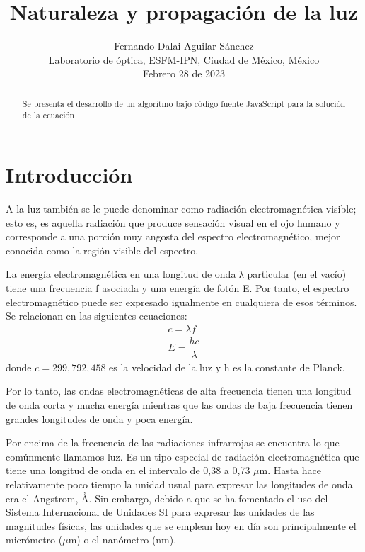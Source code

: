 \documentclass[10pt,journal]{IEEEtran}
\begin{document}
\title{Naturaleza y propagación de la luz}

\author{Fernando Dalai Aguilar Sánchez \\ Laboratorio de óptica, ESFM-IPN, Ciudad de México, México \\Febrero 28 de 2023}


\maketitle{}  

\begin{abstract}
Se presenta el desarrollo de un algoritmo bajo código fuente JavaScript para la solución de la ecuación 
\end{abstract}  

\section{Introducción}
A la luz también se le puede denominar como radiación electromagnética visible; esto
es, es aquella radiación que produce sensación visual en el ojo humano y corresponde a
una porción muy angosta del espectro electromagnético, mejor conocida como la región
visible del espectro.

La energía electromagnética en una longitud de onda λ particular (en el vacío) tiene una
frecuencia f asociada y una energía de fotón E. Por tanto, el espectro electromagnético
puede ser expresado igualmente en cualquiera de esos términos. Se relacionan en las
siguientes ecuaciones: 
\begin{align}
c = \lambda f \\
E = \dfrac{h c}{\lambda}
\end{align}
donde $c = 299{,}792{,}458$ es la velocidad de la luz y h es la constante de Planck. 

Por lo tanto, las ondas electromagnéticas de alta frecuencia tienen una longitud de onda
corta y mucha energía mientras que las ondas de baja frecuencia tienen grandes
longitudes de onda y poca energía.

Por encima de la frecuencia de las radiaciones infrarrojas se encuentra lo que
comúnmente llamamos luz. Es un tipo especial de radiación electromagnética que tiene
una longitud de onda en el intervalo de 0,38 a 0,73 $\mu$m. Hasta hace relativamente poco
tiempo la unidad usual para expresar las longitudes de onda era el Angstrom, Ǻ. Sin
embargo, debido a que se ha fomentado el uso del Sistema Internacional de Unidades SI
para expresar las unidades de las magnitudes físicas, las unidades que se emplean hoy
en día son principalmente el micrómetro ($\mu$m) o el nanómetro (nm).
\end{document}
